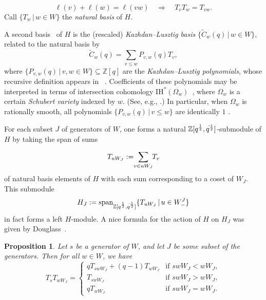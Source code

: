 \documentclass[12pt]{amsart}
\newtheorem{prop}[thm]{Proposition}
\theoremstyle{definition}
\numberwithin{equation}{section}
\newcommand{\sn}{\mathfrak{S}_n}
\newcommand{\bn}{\mathfrak{B}_n}
\newcommand{\zqq}{\mathbb{Z}[\qp12, \qm12]}
\newcommand{\qp}[2]{q^{\frac{#1}{#2}}}
\newcommand{\qm}[2]{q^{\negthinspace\Bar\,\frac{#1}{#2}}}
\newcommand{\hbjq}{H_J^{\msfBC}(q)}
\newcommand{\icoh}{\mathrm{IH}}
\newcommand{\Wejm}{W^J_-}
\newcommand{\wtc}[2]{\widetilde{C}_{#1}(#2)}
\newcommand{\defeq}{:=}
\newcommand{\spn}{\mathrm{span}}
\newcommand{\ntksp}{\negthickspace}
\newcommand{\msfA}{\mathsf{A}}
\newcommand{\msfBC}{\mathsf{BC}}
\newcommand{\schub}[1]{\Omega_{#1}}
\begin{document}
\begin{equation}\label{eq:tvtwtvw}
    \ell(v) + \ell(w) = \ell(vw) \quad \Rightarrow \quad T_vT_w = T_{vw}.
\end{equation}
Call $\{ T_w \,|\, w \in W \}$ the {\em natural basis} of $H$.

A second basis~\cite{KLRepCH} 
of $H$ is the (rescaled)
{\em Kazhdan--Lusztig basis} $\{ \wtc wq \,|\, w \in W \}$,
related to the natural basis by
\begin{equation}\label{eq:wtcdef}
  \wtc wq = \sum_{v \leq w} P_{v,w}(q) T_v,
\end{equation}
where
$\{ P_{v,w}(q) \,|\, v, w \in W \} \subseteq \mathbb Z[q]$ are the
{\em Kazhdan--Lusztig polynomials},
whose recursive definition appears in ~\cite{KLRepCH}. Coefficients of these polynomials may be interpreted in terms of
intersection cohomology $\icoh^*(\schub w)$~\cite{KLSchub}, where $\schub w$ is a certain {\em Schubert variety} indexed by $w$. (See, e.g., \cite{BilleyLak}.) In particular, when $\schub w$ is rationally smooth, all polynomials $\{P_{v,w}(q) \,|\, v \leq w\}$ are identically $1$ \cite[Thm.\,A.2]{KLRepCH}.


For each subset $J$ of generators of $W$, one forms a natural $\zqq$-submodule 
of $H$ by taking the span of sums

\begin{equation}\label{eq:cosetsum}
T_{uW_J} \defeq \ntksp \sum_{v \in uW_J} \ntksp T_v
\end{equation}
of natural basis elements of $H$ with each sum corresponding to a coset of $W_J$. This submodule
\begin{equation}\label{eq:hbjqdef}
H_J
\defeq \spn_{\zqq} \{ T_{uW_J} \,|\, u \in \Wejm \}
\end{equation}
in fact forms a left $H$-module. A nice formula for the action of $H$ on $H_J$ was given by Douglass~\cite[Prop.~2.3]{DougInv}. %
\begin{prop}\label{p:douglass}
    Let $s$ be a generator of $W$, and let $J$ 
    be some subset of the generators. %
    Then for all $w \in  W$, we have
\begin{equation} T_s T_{w W_J} = \left\{ \begin{array}{cc}
    q T_{s w W_J} + (q-1)T_{w W_J} & \text{if } swW_J < wW_J, \\
    T_{s w W_J} & \text{if } swW_J > wW_J ,\\
    q T_{w W_J} & \text{if } swW_J = wW_J .\end{array} \right.
    \end{equation}
\end{prop}
\end{document}
